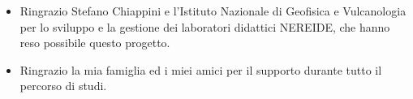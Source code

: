 \documentclass[12pt,a4paper,openright,twoside]{book}
\begin{document}

\backmatter

\nocite{*} %




\begin{acknowledgements} %
\begin{itemize}
    \item{
        Ringrazio Stefano Chiappini e l'Istituto Nazionale di Geofisica e Vulcanologia per lo sviluppo e la gestione dei laboratori didattici NEREIDE, che hanno reso possibile questo progetto.
    }
    \item{
        Ringrazio la mia famiglia ed i miei amici per il supporto durante tutto il percorso di studi.
    }
\end{itemize}
\end{acknowledgements}
\end{document}

